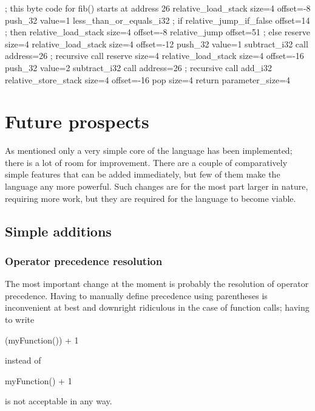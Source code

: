\begin{codelisting}[caption="Byte code translation of function fib() in listing \ref{lst:result_language}",label={lst:result_bytecode}]
; this byte code for fib() starts at address 26
relative_load_stack size=4 offset=-8
push_32 value=1
less_than_or_equals_i32
; if
relative_jump_if_false offset=14
; then
	relative_load_stack size=4 offset=-8
	relative_jump offset=51
; else
	reserve size=4
	relative_load_stack size=4 offset=-12
	push_32 value=1
	subtract_i32
	call address=26 ; recursive call
	reserve size=4
	relative_load_stack size=4 offset=-16
	push_32 value=2
	subtract_i32
	call address=26 ; recursive call
	add_i32
relative_store_stack size=4 offset=-16
pop size=4
return parameter_size=4
\end{codelisting}

\chapter{Future prospects}

As mentioned only a very simple core of the language has been implemented; there is a lot of room for improvement. There are a couple of comparatively simple features that can be added immediately, but few of them make the language any more powerful. Such changes are for the most part larger in nature, requiring more work, but they are required for the language to become viable.

    \section{Simple additions}
    
    	\subsection{Operator precedence resolution}
    	
    	The most important change at the moment is probably the resolution of operator precedence. Having to manually define precedence using parentheses is inconvenient at best and downright ridiculous in the case of function calls; having to write
		\begin{perseuslisting}
(myFunction()) + 1
		\end{perseuslisting}
		instead of
		\begin{perseuslisting}
myFunction() + 1
		\end{perseuslisting}
		is not acceptable in any way.
		
